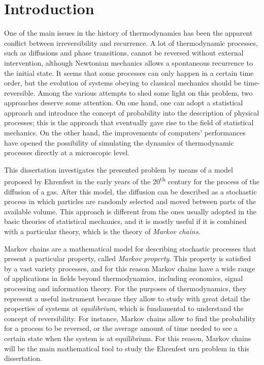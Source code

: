 \chapter{Introduction}
One of the main issues in the history of thermodynamics has been the apparent conflict between irreversibility and recurrence. A lot of thermodynamic processes, such as diffusions and phase transitions, cannot be reversed without external intervention, although Newtonian mechanics allows a spontaneous recurrence to the initial state. It seems that some processes can only happen in a certain time order, but the evolution of systems obeying to classical mechanics should be time-reversible. Among the various attempts to shed some light on this problem, two approaches deserve some attention. On one hand, one can adopt a statistical approach and introduce the concept of probability into the description of physical processes; this is the approach that eventually gave rise to the field of statistical mechanics. On the other hand, the improvements of computers' performances have opened the possibility of simulating the dynamics of thermodynamic processes directly at a microscopic level.

This dissertation investigates the presented problem by means of a model proposed by Ehrenfest in the early years of the 20\textsuperscript{th} century for the process of the diffusion of a gas. After this model, the diffusion can be described as a stochastic process in which particles are randomly selected and moved between parts of the available volume. This approach is different from the ones usually adopted in the basic theories of statistical mechanics, and it is mostly useful if it is combined with a particular theory, which is the theory of \emph{Markov chains}.

Markov chains are a mathematical model for describing stochastic processes that present a particular property, called \emph{Markov property}. This property is satisfied by a vast variety processes, and for this reason Markov chains have a wide range of applications in fields beyond thermodynamics, including economics, signal processing and information theory. For the purposes of thermodynamics, they represent a useful instrument because they allow to study with great detail the properties of systems at \emph{equilibrium}, which is fundamental to understand the concept of reversibility. For instance, Markov chains allow to find the probability for a process to be reversed, or the average amount of time needed to see a certain state when the system is at equilibrium. For this reason, Markov chains will be the main mathematical tool to study the Ehrenfest urn problem in this dissertation.

